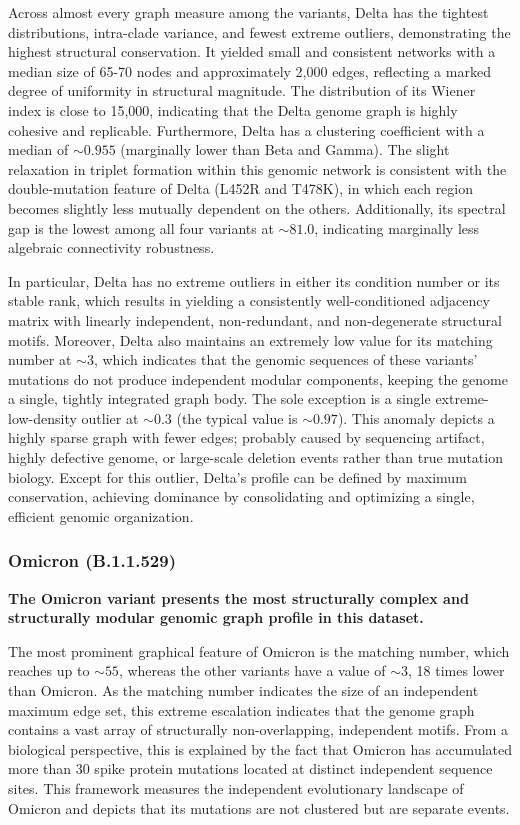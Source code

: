 \documentclass[conference]{IEEEtran}
\begin{document}
Across almost every graph measure among the variants, Delta has the tightest distributions, intra-clade variance, and fewest extreme outliers, demonstrating the highest structural conservation. It yielded small and consistent networks with a median size of 65-70 nodes and approximately 2,000 edges, reflecting a marked degree of uniformity in structural magnitude. The distribution of its Wiener index is close to 15,000, indicating that the Delta genome graph is highly cohesive and replicable. Furthermore, Delta has a clustering coefficient with a median of $\sim 0.955$  (marginally lower than Beta and Gamma). The slight relaxation in triplet formation within this genomic network is consistent with the double-mutation feature of Delta (L452R and T478K), in which each region becomes slightly less mutually dependent on the others. Additionally, its spectral gap is the lowest among all four variants at $\sim 81.0$, indicating marginally less algebraic connectivity robustness.

In particular, Delta has no extreme outliers in either its condition number or its stable rank, which results  in yielding a consistently well-conditioned adjacency matrix with linearly independent, non-redundant, and non-degenerate structural motifs. Moreover, Delta also maintains an extremely low value for its matching number at $\sim 3$, which indicates that the genomic sequences of these variants' mutations do not produce independent modular components, keeping the genome a single, tightly integrated graph body. The sole exception is a single extreme-low-density outlier at $\sim 0.3$ (the typical value is $\sim 0.97$). This anomaly depicts a highly sparse graph with fewer edges; probably caused by sequencing artifact, highly defective genome, or large-scale deletion events rather than true mutation biology. Except for this outlier, Delta's profile can be defined by maximum conservation, achieving dominance by consolidating and optimizing a single, efficient genomic organization.

\subsubsection{Omicron (B.1.1.529)}

\textbf{The Omicron variant presents the most structurally complex and structurally modular genomic graph profile in this dataset.}

The most prominent graphical feature of Omicron is the matching number, which reaches up to $\sim 55$, whereas the other variants have a value of $\sim 3$, 18 times lower than Omicron. As the matching number indicates the size of an independent maximum edge set, this extreme escalation indicates that the genome graph contains a vast array of structurally non-overlapping, independent motifs. From a biological perspective, this is explained by the fact that Omicron has accumulated more than 30 spike protein mutations located at distinct independent sequence sites. This framework measures the independent evolutionary landscape of Omicron and depicts that its mutations are not clustered but are separate events.
\end{document}

